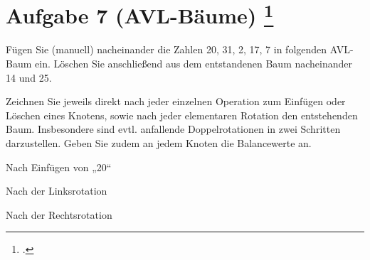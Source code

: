 \documentclass{lehramt-informatik-aufgabe}
\begin{document}
\section{Aufgabe 7 (AVL-Bäume)
\footcite{examen:66115:2019:09}}

Fügen Sie (manuell) nacheinander die Zahlen 20, 31, 2, 17, 7 in
folgenden AVL-Baum ein. Löschen Sie anschließend aus dem entstandenen
Baum nacheinander 14 und 25.

\begin{center}
\end{center}

\noindent
Zeichnen Sie jeweils direkt nach jeder einzelnen Operation zum Einfügen
oder Löschen eines Knotens, sowie nach jeder elementaren Rotation den
entstehenden Baum. Insbesondere sind evtl. anfallende Doppelrotationen
in zwei Schritten darzustellen. Geben Sie zudem an jedem Knoten die
Balancewerte an.

\begin{liDiagramm}{Nach Einfügen von „20“}
\end{liDiagramm}

\begin{liDiagramm}{Nach der Linksrotation}
\end{liDiagramm}

\begin{liDiagramm}{Nach der Rechtsrotation}
\end{liDiagramm}
\end{document}

